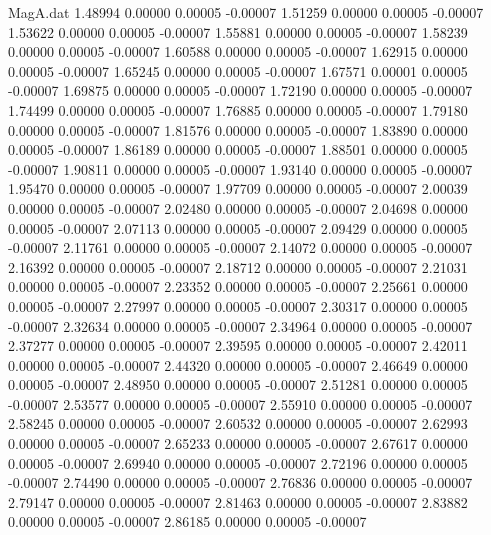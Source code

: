 \begin{filecontents}{MagA.dat}
   1.48994    0.00000    0.00005   -0.00007
   1.51259    0.00000    0.00005   -0.00007
   1.53622    0.00000    0.00005   -0.00007
   1.55881    0.00000    0.00005   -0.00007
   1.58239    0.00000    0.00005   -0.00007
   1.60588    0.00000    0.00005   -0.00007
   1.62915    0.00000    0.00005   -0.00007
   1.65245    0.00000    0.00005   -0.00007
   1.67571    0.00001    0.00005   -0.00007
   1.69875    0.00000    0.00005   -0.00007
   1.72190    0.00000    0.00005   -0.00007
   1.74499    0.00000    0.00005   -0.00007
   1.76885    0.00000    0.00005   -0.00007
   1.79180    0.00000    0.00005   -0.00007
   1.81576    0.00000    0.00005   -0.00007
   1.83890    0.00000    0.00005   -0.00007
   1.86189    0.00000    0.00005   -0.00007
   1.88501    0.00000    0.00005   -0.00007
   1.90811    0.00000    0.00005   -0.00007
   1.93140    0.00000    0.00005   -0.00007
   1.95470    0.00000    0.00005   -0.00007
   1.97709    0.00000    0.00005   -0.00007
   2.00039    0.00000    0.00005   -0.00007
   2.02480    0.00000    0.00005   -0.00007
   2.04698    0.00000    0.00005   -0.00007
   2.07113    0.00000    0.00005   -0.00007
   2.09429    0.00000    0.00005   -0.00007
   2.11761    0.00000    0.00005   -0.00007
   2.14072    0.00000    0.00005   -0.00007
   2.16392    0.00000    0.00005   -0.00007
   2.18712    0.00000    0.00005   -0.00007
   2.21031    0.00000    0.00005   -0.00007
   2.23352    0.00000    0.00005   -0.00007
   2.25661    0.00000    0.00005   -0.00007
   2.27997    0.00000    0.00005   -0.00007
   2.30317    0.00000    0.00005   -0.00007
   2.32634    0.00000    0.00005   -0.00007
   2.34964    0.00000    0.00005   -0.00007
   2.37277    0.00000    0.00005   -0.00007
   2.39595    0.00000    0.00005   -0.00007
   2.42011    0.00000    0.00005   -0.00007
   2.44320    0.00000    0.00005   -0.00007
   2.46649    0.00000    0.00005   -0.00007
   2.48950    0.00000    0.00005   -0.00007
   2.51281    0.00000    0.00005   -0.00007
   2.53577    0.00000    0.00005   -0.00007
   2.55910    0.00000    0.00005   -0.00007
   2.58245    0.00000    0.00005   -0.00007
   2.60532    0.00000    0.00005   -0.00007
   2.62993    0.00000    0.00005   -0.00007
   2.65233    0.00000    0.00005   -0.00007
   2.67617    0.00000    0.00005   -0.00007
   2.69940    0.00000    0.00005   -0.00007
   2.72196    0.00000    0.00005   -0.00007
   2.74490    0.00000    0.00005   -0.00007
   2.76836    0.00000    0.00005   -0.00007
   2.79147    0.00000    0.00005   -0.00007
   2.81463    0.00000    0.00005   -0.00007
   2.83882    0.00000    0.00005   -0.00007
   2.86185    0.00000    0.00005   -0.00007

\end{filecontents}
